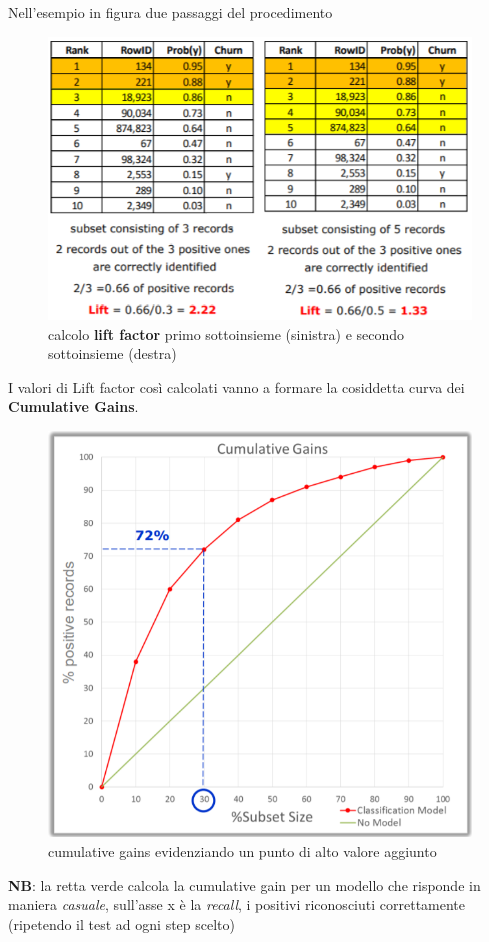 Nell'esempio in figura due passaggi del procedimento 
\begin{figure}[H]
	\centering
	\includegraphics[height=0.6 \linewidth]{classification/pict/liftFactor.png}
	\caption{calcolo \textbf{lift factor} primo sottoinsieme (sinistra) e secondo sottoinsieme (destra)}
\end{figure}

\begin{defn}
	I valori di Lift factor così calcolati vanno a formare la cosiddetta curva dei \textbf{Cumulative Gains}.
\end{defn}
\begin{figure}[H]
	\centering
	\includegraphics[height=0.6 \linewidth]{classification/pict/cumulative_gains.png}
	\caption{cumulative gains evidenziando un punto di alto valore aggiunto}
\end{figure}

\textbf{NB}: la retta {\color{ao(english)}verde} calcola la cumulative gain per un modello che risponde in maniera \textit{casuale}, sull'asse x \`e la \textit{recall}, i positivi riconosciuti correttamente (ripetendo il test ad ogni step scelto)
